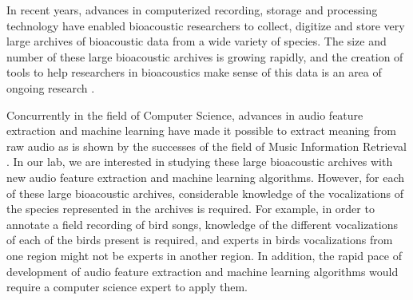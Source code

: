 \documentclass[12pt,oneside]{book}
\begin{document}
%
%
\newcommand{\totalNumberOfOrchiveRecordings}{23,511 }
\newcommand{\aboutNumberOfOrchiveRecordings}{23,000 }
\newcommand{\totalHoursOfOrchiveRecordings}{17,633 }
\newcommand{\aboutHoursOfOrchiveRecordings}{17,000 }
\newcommand{\totalYearsOrcaLabCollecting}{30 }
\newcommand{\totalYearsAnnotationsCollected}{5 }
\newcommand{\totalAnnotations}{22,135 }
\newcommand{\totalAnnotationsGB}{7.3GB }
\newcommand{\totalAnnotationsTimeMinutes}{720 }
\newcommand{\totalAnnotationsTimeHours}{12 }
\newcommand{\totalExperts}{12 }
\newcommand{\totalClipsInORCAOBV}{11,041 }
\newcommand{\totalClipsInORCACALL}{2985 }
\newcommand{\totalCallsInORCACALL}{12 }
\newcommand{\diskSpaceOrchive}{17TB }
\newcommand{\classificationAccuracyOBV}{92\% }
\newcommand{\classificationAccuracyCALLS}{76\% }



\newpage


\label{chap:introduction}

In recent years, advances in computerized recording, storage and
processing technology have enabled bioacoustic researchers to collect,
digitize and store very large archives of bioacoustic data from a wide
variety of species. The size and number of these large bioacoustic
archives is growing rapidly, and the creation of tools to help
researchers in bioacoustics make sense of this data is an area of
ongoing research \cite{halkias2013icml4b}.

Concurrently in the field of Computer Science, advances in audio
feature extraction and machine learning have made it possible to
extract meaning from raw audio as is shown by the successes of the
field of Music Information Retrieval \cite{tzanetakis2008marsyas}.  In
our lab, we are interested in studying these large bioacoustic
archives with new audio feature extraction and machine learning
algorithms.  However, for each of these large bioacoustic archives,
considerable knowledge of the vocalizations of the species represented
in the archives is required.  For example, in order to annotate a
field recording of bird songs, knowledge of the different
vocalizations of each of the birds present is required, and experts in
birds vocalizations from one region might not be experts in another
region.  In addition, the rapid pace of development of audio feature
extraction and machine learning algorithms would require a computer
science expert to apply them.
\end{document}
